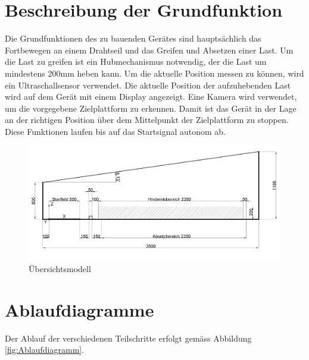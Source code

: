 \documentclass[a4paper]{report}
\begin{document}
\section{Beschreibung der Grundfunktion}
\label{sec:GrundBeschrieb}
Die Grundfunktionen des zu bauenden Gerätes sind hauptsächlich das Fortbewegen an einem Drahtseil und das Greifen und Absetzen einer Last. Um die Last zu greifen ist ein Hubmechanismus notwendig, der die Last um mindestens 200mm heben kann. Um die aktuelle Position messen zu können, wird ein Ultraschallsensor verwendet. Die aktuelle Position der aufzuhebenden Last wird auf dem Gerät mit einem Display angezeigt. Eine Kamera wird verwendet, um die vorgegebene Zielplattform zu erkennen. Damit ist das Gerät in der Lage an der richtigen Position über dem Mittelpunkt der Zielplattform zu stoppen. Diese Funktionen laufen bis auf das Startsignal autonom ab.

\begin{figure}[h!]
	\includegraphics[keepaspectratio,width=\textwidth]{PrenFunktionsskizze}
	\caption{Übersichtsmodell}
	\label{fig:Funktionsskizze}
\end{figure}

\newpage
\section{Ablaufdiagramme}
\label{sec:Ablaufdiagramme}
Der Ablauf der verschiedenen Teilschritte erfolgt gemäss Abbildung \ref{fig:Ablaufdiagramm}.
\end{document}
